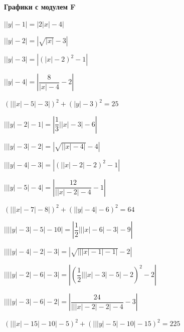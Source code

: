 \centerline{\bf \Huge Графики с модулем F}

 $\left|\left|y\right|-1\right|=\left|2\left|x\right|-4\right|$

 $\left|\left|y\right|-2\right|=\left|\sqrt{\left|x\right|}-3\right|$

 $\left|\left|y\right|-3\right|=\left|\left(\left|x\right|-2\right)^{2}-1\right|$

 $\left|\left|y\right|-4\right|=\left|\dfrac{8}{\left|x\right|-4}-2\right|$

 $\left(\left|\left|\left|x\right|-5\right|-3\right|\right)^{2}+\left(\left|y\right|-3\right)^{2}=25$

 $\left|\left|\left|y\right|-2\right|-1\right|=\left|\dfrac{1}{3}\left|\left|x\right|-3\right|-6\right|$

 $\left|\left|\left|y\right|-3\right|-2\right|=\left|\sqrt{\left|\left|x\right|-4\right|}-4\right|$

 $\left|\left|\left|y\right|-4\right|-3\right|=\left|\left(\left|\left|x\right|-2\right|-2\right)^{2}-1\right|$

 $\left|\left|\left|y\right|-5\right|-4\right|=\left|\dfrac{12}{\left|\left|x\right|-2\right|-4}-1\right|$

 $\left(\left|\left|\left|x\right|-7\right|-8\right|\right)^{2}+\left(\left|\left|y\right|-4\right|-6\right)^{2}=64$

 $\left|\left|\left|\left|y\right|-3\right|-5\right|-10\right|=\left|\dfrac{1}{2}\left|\left|\left|x\right|-6\right|-3\right|-9\right|$

 $\left|\left|\left|\left|y\right|-4\right|-2\right|-3\right|=\left|\sqrt{\left|\left|\left|x\right|-1\right|-1\right|}-2\right|$

 $\left|\left|\left|\left|y\right|-2\right|-6\right|-3\right|=\left|\left(\dfrac{1}{2}\left|\left|\left|x\right|-3\right|-5\right|-2\right)^{2}-2\right|$

 $\left|\left|\left|\left|y\right|-3\right|-6\right|-2\right|=\left|\dfrac{24}{\left|\left|\left|x\right|-2\right|-2\right|-4}-3\right|$

 $\left(\left|\left|\left|x\right|-15\right|-10\right|-5\right)^{2}+\left(\left|\left|\left|y\right|-5\right|-10\right|-15\right)^{2}=225$

